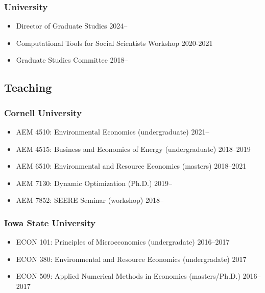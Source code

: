 \documentclass[12pt]{res} %
\begin{document}
\begin{resume}
\vspace{-.2in}

\subsubsection{University}
\begin{itemize} \itemsep -1pt
	\item[] Director of Graduate Studies \hfill 2024--
	\item[] Computational Tools for Social Scientists Workshop \hfill 2020-2021
	\item[]	Graduate Studies Committee \hfill 2018--
\end{itemize}

\vspace{-.2in}

\subsection{Teaching}\vspace{-.2in}
\subsubsection{Cornell University}
\begin{itemize} \itemsep -1pt
	\item[] AEM 4510: Environmental Economics (undergraduate) \hfill 2021--
	\item[] AEM 4515: Business and Economics of Energy (undergraduate) \hfill 2018--2019
	\item[] AEM 6510: Environmental and Resource Economics (masters) \hfill 2018--2021
	\item[] AEM 7130: Dynamic Optimization (Ph.D.) \hfill 2019--
	\item[] AEM 7852: SEERE Seminar (workshop) \hfill 2018--
\end{itemize}\vspace{-.3in}
\subsubsection{Iowa State University}
\begin{itemize} \itemsep -1pt
	\item[] ECON 101: Principles of Microeconomics (undergradate) \hfill 2016--2017
	\item[] ECON 380: Environmental and Resource Economics (undergradate) \hfill 2017
	\item[] ECON 509: Applied Numerical Methods in Economics (masters/Ph.D.) \hfill 2016--2017
\end{itemize}\vspace{-.3in}

\end{resume}
\end{document}
